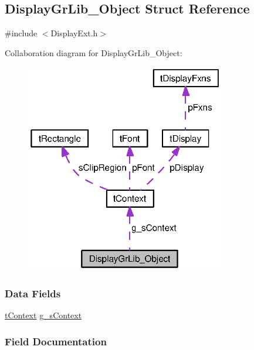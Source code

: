 \subsection{Display\+Gr\+Lib\+\_\+\+Object Struct Reference}
\label{struct_display_gr_lib___object}


{\ttfamily \#include $<$Display\+Ext.\+h$>$}



Collaboration diagram for Display\+Gr\+Lib\+\_\+\+Object\+:
\nopagebreak
\begin{figure}[H]
\begin{center}
\leavevmode
\includegraphics[width=247pt]{struct_display_gr_lib___object__coll__graph}
\end{center}
\end{figure}
\subsubsection*{Data Fields}
\begin{DoxyCompactItemize}
\item 
\hyperlink{structt_context}{t\+Context} \hyperlink{struct_display_gr_lib___object_a26d29c5097a4edbf1d6fa8f2907c04e4}{g\+\_\+s\+Context}
\end{DoxyCompactItemize}


\subsubsection{Field Documentation}
